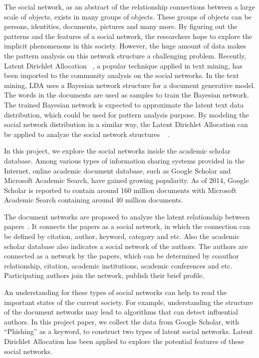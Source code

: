 \documentclass[letterpaper]{article}
\begin{document}
The social network, as an abstract of the relationship connections between a large scale of objects, exists in many groups of objects.
These groups of objects can be persons, identities, documents, pictures and many more.
By figuring out the patterns and the features of a social network, the researchers hope to explore the implicit phenomenons in this society.
However, the huge amount of data makes the pattern analysis on this network structure a challenging problem.
Recently, Latent Dirichlet Allocation~\cite{Blei:2003:LDA:944919.944937} , a popular technique applied in text mining, has been imported to the community analysis on the social networks.
In the text mining, LDA uses a Bayesian network structure for a document generative model.
The words in the documents are used as samples to train the Bayesian network.
The trained Bayesian network is expected to approximate the latent text data distribution, which could be used for pattern analysis purpose.
By modeling the social network distribution in a similar way, the Latent Dirichlet Allocation can be applied to analyze the social network structures
~\cite{4258697} \cite{Cha:2012:SAU:2348283.2348360} \cite{Henderson:2009:ALD:1529282.1529607}.

In this project, we explore the social networks inside the academic scholar database.
Among various types of information sharing systems provided in the Internet, online academic document database, such as Google Scholar and Microsoft Academic Search, have gained growing popularity.
As of 2014, Google Scholar is reported to contain around 160 million documents with Microsoft Academic Search containing around 40 million documents. 

The document networks are proposed to analyze the latent relationship between papers~\cite{chang2009relational}.
It connects the papers as a social network, in which the connection can be defined by citation, author, keyword, category and etc.
Also the academic scholar database also indicates a social network of the authors.
The authors are connected as a network by the papers, which can be determined by coauthor relationship, citation, academic institutions, academic conferences and etc.
Participating authors join the network, publish their brief profile.

An understanding for these types of social networks can help to read the important states of the current society.
For example, understanding the structure of the document networks may lead to algorithms that can detect influential authors.
In this project paper, we collect the data from Google Scholar, with ``Phishing'' as a keyword, to construct two types of latent social networks.
Latent Dirichlet Allocation has been applied to explore the potential features of these social networks.
\end{document}
